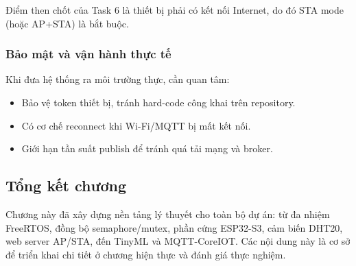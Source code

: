 Điểm then chốt của Task 6 là thiết bị phải có kết nối Internet, do đó STA mode (hoặc AP+STA) là bắt buộc.

\subsubsection*{Bảo mật và vận hành thực tế}

Khi đưa hệ thống ra môi trường thực, cần quan tâm:
\begin{itemize}
    \item Bảo vệ token thiết bị, tránh hard-code công khai trên repository.
    \item Có cơ chế reconnect khi Wi-Fi/MQTT bị mất kết nối.
    \item Giới hạn tần suất publish để tránh quá tải mạng và broker.
\end{itemize}

\subsection{Tổng kết chương}

Chương này đã xây dựng nền tảng lý thuyết cho toàn bộ dự án: từ đa nhiệm FreeRTOS, đồng bộ semaphore/mutex, phần cứng ESP32-S3, cảm biến DHT20, web server AP/STA, đến TinyML và MQTT-CoreIOT. Các nội dung này là cơ sở để triển khai chi tiết ở chương hiện thực và đánh giá thực nghiệm.


